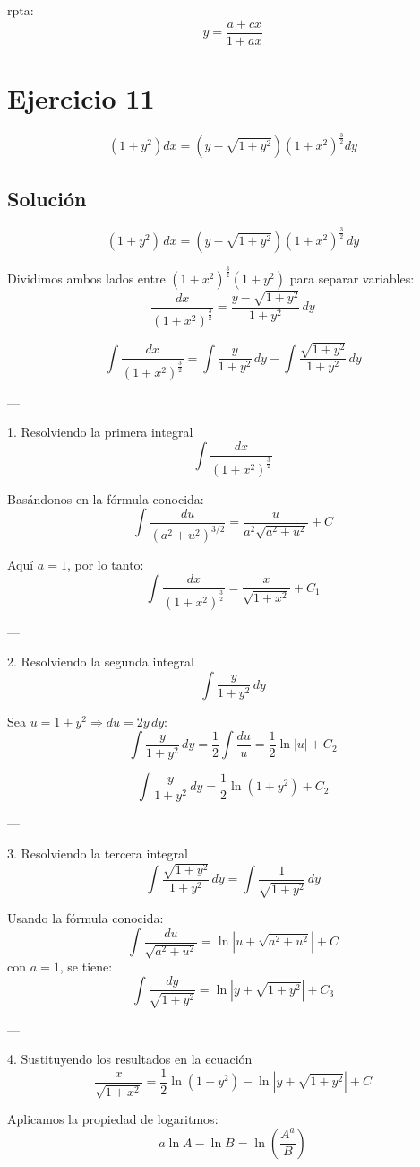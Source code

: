 \documentclass[12pt,a4paper]{article}
\begin{document}
\begin{multicols}{2}
rpta: \[y=\frac{a+cx}{1+ax}\]
\section*{Ejercicio 11}
\[(1+y^2)dx=(y-\sqrt{1+y^2})(1+x^2)^{\frac{3}{2}}dy\]

\subsection*{Solución}
\[
(1+y^2)\,dx = (y - \sqrt{1+y^2})(1+x^2)^{\frac{3}{2}}\,dy
\]

\noindent
Dividimos ambos lados entre \((1+x^2)^{\frac{3}{2}}(1+y^2)\) para separar variables:
\[
\frac{dx}{(1+x^2)^{\frac{3}{2}}} = \frac{y-\sqrt{1+y^2}}{1+y^2}\,dy
\]

\[
\int\frac{dx}{(1+x^2)^{\frac{3}{2}}}
=
\int\frac{y}{1+y^2}\,dy
-
\int\frac{\sqrt{1+y^2}}{1+y^2}\,dy
\]

---

 1. Resolviendo la primera integral
\[
\int\frac{dx}{(1+x^2)^{\frac{3}{2}}}
\]

\noindent
Basándonos en la fórmula conocida:
\[
\int\frac{du}{(a^2+u^2)^{3/2}} = \frac{u}{a^2\sqrt{a^2+u^2}} + C
\]

\noindent
Aquí \(a=1\), por lo tanto:
\[
\int\frac{dx}{(1+x^2)^{\frac{3}{2}}} = \frac{x}{\sqrt{1+x^2}} + C_1
\]

---

2. Resolviendo la segunda integral
\[
\int\frac{y}{1+y^2}\,dy
\]

\noindent
Sea \(u = 1+y^2 \Rightarrow du = 2y\,dy\):
\[
\int\frac{y}{1+y^2}\,dy = \frac{1}{2}\int\frac{du}{u} = \frac{1}{2}\ln|u| + C_2
\]

\[
\int\frac{y}{1+y^2}\,dy = \frac{1}{2}\ln(1+y^2) + C_2
\]

---

3. Resolviendo la tercera integral
\[
\int\frac{\sqrt{1+y^2}}{1+y^2}\,dy = \int\frac{1}{\sqrt{1+y^2}}\,dy
\]

\noindent
Usando la fórmula conocida:
\[
\int\frac{du}{\sqrt{a^2+u^2}} = \ln|u+\sqrt{a^2+u^2}| + C
\]
con \(a=1\), se tiene:
\[
\int\frac{dy}{\sqrt{1+y^2}} = \ln|y+\sqrt{1+y^2}| + C_3
\]

---

 4. Sustituyendo los resultados en la ecuación
\[
\frac{x}{\sqrt{1+x^2}} = \frac{1}{2}\ln(1+y^2) - \ln|y+\sqrt{1+y^2}| + C
\]

\noindent
Aplicamos la propiedad de logaritmos:
\[
a\ln A - \ln B = \ln\!\left(\frac{A^a}{B}\right)
\]


\end{multicols}
\end{document}
